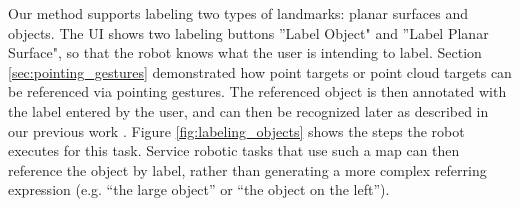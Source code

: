 \documentclass{tADR2e}
\begin{document}
Our method supports labeling two types of landmarks: planar surfaces and objects. The UI shows two labeling buttons ''Label Object" and ''Label Planar Surface", so that the robot knows what the user is intending to label. Section \ref{sec:pointing_gestures} demonstrated how point targets or point cloud targets can be referenced via pointing gestures. The referenced object is then annotated
with the label entered by the user, and can then be recognized later as described in our previous work \cite{trevor2013interactive}. Figure \ref{fig:labeling_objects} shows the steps the robot executes for this task. Service robotic tasks that use such a map can then reference the object
by label, rather than generating a more complex referring expression (e.g. “the large
object” or “the object on the left”).

\begin{figure}
\begin{center}
\begin{minipage}{160mm}
\subfigure[]{
}
\end{minipage}
\end{center}
\end{figure}
\end{document}
